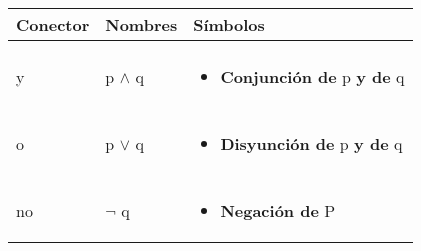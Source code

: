 \documentclass[12pt, fleqn]{report}                             %
\begin{document}
            \begin{longtable}{p{30mm} || p{30mm} || p{80mm}}

                \textbf{\large Conector} & \textbf{\large Nombres} & \textbf{\large Símbolos} \\[1.5ex]
                \hline\hline & & \\                                                                    
                \endhead                                                     

                \large y  &  \large{p $\land$ q}                                            &

                \begin{minipage}[t]{\textwidth}\begin{itemize}
                    \item \textbf{Conjunción de} p \textbf{y de} q
                \end{itemize}\end{minipage}                                                 \\[1.5ex]
                
                \hline & & \\ \large o  &  \large{p $\lor$ q}                               &
                
                \begin{minipage}[t]{\textwidth}\begin{itemize}
                    \item \textbf{Disyunción de} p \textbf{y de} q
                \end{itemize}\end{minipage}                                                 \\[1.5ex]


                \hline & & \\ \large no  &  \large{$\lnot$ q}                               &

                \begin{minipage}[t]{\textwidth}\begin{itemize}
                    \item \textbf{Negación de} P
                \end{itemize}\end{minipage}                                                 \\[1.5ex]


\end{longtable}
\end{document}
